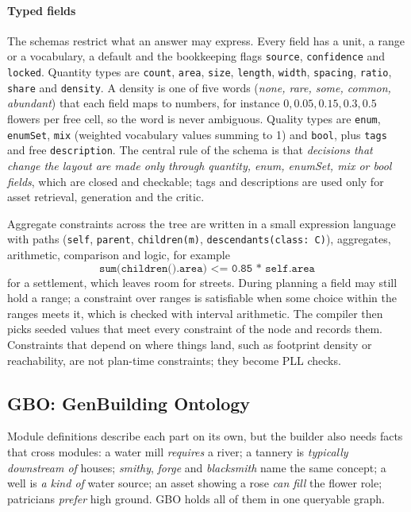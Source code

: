 \documentclass[conference]{IEEEtran}
\begin{document}
\paragraph{Typed fields} The schemas restrict what an answer may express. Every field has
a unit, a range or a vocabulary, a default and the bookkeeping flags \texttt{source},
\texttt{confidence} and \texttt{locked}. Quantity types are \texttt{count}, \texttt{area},
\texttt{size}, \texttt{length}, \texttt{width}, \texttt{spacing}, \texttt{ratio},
\texttt{share} and \texttt{density}. A density is one of five words (\emph{none, rare,
some, common, abundant}) that each field maps to numbers, for instance $0, 0.05, 0.15,
0.3, 0.5$ flowers per free cell, so the word is never ambiguous. Quality types are
\texttt{enum}, \texttt{enumSet}, \texttt{mix} (weighted vocabulary values summing to 1)
and \texttt{bool}, plus \texttt{tags} and free \texttt{description}. The central rule of
the schema is that \emph{decisions that change the layout are made only through
quantity, enum, enumSet, mix or bool fields}, which are closed and checkable; tags and
descriptions are used only for asset retrieval, generation and the critic.

Aggregate constraints across the tree are written in a small expression language with
paths (\texttt{self}, \texttt{parent}, \texttt{children(m)}, \texttt{descendants(class: C)}),
aggregates, arithmetic, comparison and logic, for example
\begin{equation*}
\texttt{sum(children().area) <= 0.85 * self.area}
\end{equation*}
for a settlement, which leaves room for streets. During planning a field may still hold a
range; a constraint over ranges is satisfiable when some choice within the ranges meets
it, which is checked with interval arithmetic. The compiler then picks seeded values that
meet every constraint of the node and records them. Constraints that depend on where
things land, such as footprint density or reachability, are not plan-time constraints;
they become PLL checks.

\subsection{GBO: GenBuilding Ontology}

Module definitions describe each part on its own, but the builder also needs facts that
cross modules: a water mill \emph{requires} a river; a tannery is \emph{typically
downstream of} houses; \emph{smithy}, \emph{forge} and \emph{blacksmith} name the same
concept; a well is \emph{a kind of} water source; an asset showing a rose \emph{can fill}
the flower role; patricians \emph{prefer} high ground. GBO holds all of them in one
queryable graph.
\end{document}
